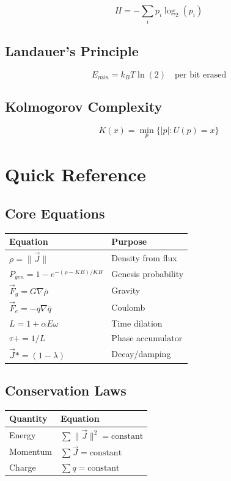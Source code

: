 \documentclass[
  11pt,
  letterpaper,
  twoside,
  openright]{book}
\begin{document}
\[
H = -\sum_i p_i \log_2(p_i)
\]

\subsection{Landauer's Principle}\label{landauers-principle-1}

\[
E_{min} = k_B T \ln(2) \quad \text{per bit erased}
\]

\subsection{Kolmogorov Complexity}\label{kolmogorov-complexity-1}

\[
K(x) = \min_p\{|p| : U(p) = x\}
\]

\section{Quick Reference}\label{quick-reference}

\subsection{Core Equations}\label{core-equations}

\begin{longtable}[]{@{}ll@{}}
\toprule\noalign{}
Equation & Purpose \\
\midrule\noalign{}
\endhead
\bottomrule\noalign{}
\endlastfoot
\(\rho = \|\vec{J}\|\) & Density from flux \\
\(P_{gen} = 1 - e^{-(\rho-KB)/KB}\) & Genesis probability \\
\(\vec{F}_g = G \nabla\bar{\rho}\) & Gravity \\
\(\vec{F}_e = -q \nabla\bar{q}\) & Coulomb \\
\(L = 1 + \alpha E \omega\) & Time dilation \\
\(\tau += 1/L\) & Phase accumulator \\
\(\vec{J} *= (1-\lambda)\) & Decay/damping \\
\end{longtable}

\subsection{Conservation Laws}\label{conservation-laws}

\begin{longtable}[]{@{}ll@{}}
\toprule\noalign{}
Quantity & Equation \\
\midrule\noalign{}
\endhead
\bottomrule\noalign{}
\endlastfoot
Energy & \(\sum \|\vec{J}\|^2 = \text{constant}\) \\
Momentum & \(\sum \vec{J} = \text{constant}\) \\
Charge & \(\sum q = \text{constant}\) \\
\end{longtable}
\end{document}
